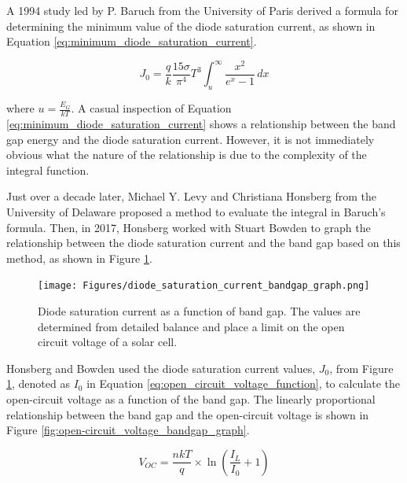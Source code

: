 A 1994 study led by P. Baruch from the University of Paris derived a formula for determining the minimum value of the diode saturation current, as shown in Equation \ref{eq:minimum_diode_saturation_current}.

\begin{equation}
    J_0 = \frac{q}{k} \frac{15\sigma}{\pi^4} T^3 \int_{u}^{\infty} \frac{x^2}{e^x - 1}\,dx
    \label{eq:minimum_diode_saturation_current}
\end{equation}

where $u = \frac{E_G}{kT}$. \cite{Baruch1995OnConversion} A casual inspection of Equation \ref{eq:minimum_diode_saturation_current} shows a relationship between the band gap energy and the diode saturation current. However, it is not immediately obvious what the nature of the relationship is due to the complexity of the integral function.\vspace{0.5em}

Just over a decade later, Michael Y. Levy and Christiana Honsberg from the University of Delaware proposed a method to evaluate the integral in Baruch's formula. \cite{Levy2006RapidApplications} Then, in 2017, Honsberg worked with Stuart Bowden to graph the relationship between the diode saturation current and the band gap based on this method, as shown in Figure \ref{fig:diode_saturation_current_bandgap_graph}.

\begin{figure}[ht]
    \centering
    \texttt{[image: Figures/diode\_saturation\_current\_bandgap\_graph.png]}
    \caption{Diode saturation current as a function of band gap. The values are determined from detailed balance and place a limit on the open circuit voltage of a solar cell. \cite{HonsbergOpen-CircuitVoltage}}
    \label{fig:diode_saturation_current_bandgap_graph}
\end{figure}
\FloatBarrier

Honsberg and Bowden used the diode saturation current values, $J_0$, from Figure \ref{fig:diode_saturation_current_bandgap_graph}, denoted as $I_0$ in Equation \ref{eq:open_circuit_voltage_function}, to calculate the open-circuit voltage as a function of the band gap. The linearly proportional relationship between the band gap and the open-circuit voltage is shown in Figure \ref{fig:open-circuit_voltage_bandgap_graph}.

\begin{equation}
    V_{OC} = \frac{n k T}{q} \times \ln\left(\frac{I_L}{I_0} + 1\right)
    \label{eq:open_circuit_voltage_function}
\end{equation}

